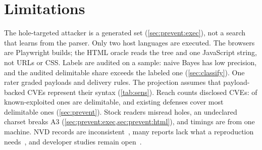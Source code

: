 \section{Limitations}
\label{sec:limits}

The hole-targeted attacker is a generated set (\cref{sec:prevent:exec}), not a
search that learns from the parser. Only two host languages are executed. The
browsers are Playwright builds; the HTML oracle reads the tree and one
JavaScript string, not URLs or CSS. Labels are audited on a sample: naive Bayes
has low precision, and the audited delimitable share exceeds the labeled one
(\cref{sec:classify}). One rater graded payloads and delivery rules. The
projection assumes that payload-backed CVEs represent their syntax
(\cref{tab:sens}). Reach counts disclosed CVEs: \dataKevHostableShare of
known-exploited ones are delimitable, and existing defenses cover most
delimitable ones (\cref{sec:prevent}). Stock readers misread holes, an
undeclared charset breaks A3 (\cref{sec:prevent:exec,sec:prevent:html}), and
timings are from one machine. NVD records are inconsistent~\cite{anwar22nvd},
many reports lack what a reproduction needs~\cite{mu18reproducibility}, and
developer studies remain open~\cite{acar16developer}.

